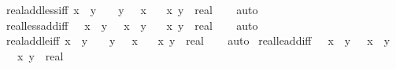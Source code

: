 \begin{isabellebody}
\ real{\isacharunderscore}{\kern0pt}add{\isacharunderscore}{\kern0pt}less{\isacharunderscore}{\kern0pt}{}{\isacharunderscore}{\kern0pt}iff{\isacharcolon}{\kern0pt}\ {\isachardoublequoteopen}x\ {\isacharplus}{\kern0pt}\ y\ {\isacharless}{\kern0pt}\ {}\ {\isasymlongleftrightarrow}\ y\ {\isacharless}{\kern0pt}\ {\isacharminus}{\kern0pt}\ x{\isachardoublequoteclose}\isanewline
\ \ \ x\ y\ {\isacharcolon}{\kern0pt}{\isacharcolon}{\kern0pt}\ real\isanewline
%
\isadelimproof
\ \ %
\endisadelimproof
%
\isatagproof
{}\isamarkupfalse%
\ auto%
\endisatagproof
{\isafoldproof}%
%
\isadelimproof
\isanewline
%
\endisadelimproof
\isanewline
{}\isamarkupfalse%
\ real{\isacharunderscore}{\kern0pt}{}{\isacharunderscore}{\kern0pt}less{\isacharunderscore}{\kern0pt}add{\isacharunderscore}{\kern0pt}iff{\isacharcolon}{\kern0pt}\ {\isachardoublequoteopen}{}\ {\isacharless}{\kern0pt}\ x\ {\isacharplus}{\kern0pt}\ y\ {\isasymlongleftrightarrow}\ {\isacharminus}{\kern0pt}\ x\ {\isacharless}{\kern0pt}\ y{\isachardoublequoteclose}\isanewline
\ \ \ x\ y\ {\isacharcolon}{\kern0pt}{\isacharcolon}{\kern0pt}\ real\isanewline
%
\isadelimproof
\ \ %
\endisadelimproof
%
\isatagproof
{}\isamarkupfalse%
\ auto%
\endisatagproof
{\isafoldproof}%
%
\isadelimproof
\isanewline
%
\endisadelimproof
\isanewline
{}\isamarkupfalse%
\ real{\isacharunderscore}{\kern0pt}add{\isacharunderscore}{\kern0pt}le{\isacharunderscore}{\kern0pt}{}{\isacharunderscore}{\kern0pt}iff{\isacharcolon}{\kern0pt}\ {\isachardoublequoteopen}x\ {\isacharplus}{\kern0pt}\ y\ {\isasymle}\ {}\ {\isasymlongleftrightarrow}\ y\ {\isasymle}\ {\isacharminus}{\kern0pt}\ x{\isachardoublequoteclose}\isanewline
\ \ \ x\ y\ {\isacharcolon}{\kern0pt}{\isacharcolon}{\kern0pt}\ real\isanewline
%
\isadelimproof
\ \ %
\endisadelimproof
%
\isatagproof
{}\isamarkupfalse%
\ auto%
\endisatagproof
{\isafoldproof}%
%
\isadelimproof
\isanewline
%
\endisadelimproof
\isanewline
{}\isamarkupfalse%
\ real{\isacharunderscore}{\kern0pt}{}{\isacharunderscore}{\kern0pt}le{\isacharunderscore}{\kern0pt}add{\isacharunderscore}{\kern0pt}iff{\isacharcolon}{\kern0pt}\ {\isachardoublequoteopen}{}\ {\isasymle}\ x\ {\isacharplus}{\kern0pt}\ y\ {\isasymlongleftrightarrow}\ {\isacharminus}{\kern0pt}\ x\ {\isasymle}\ y{\isachardoublequoteclose}\isanewline
\ \ \ x\ y\ {\isacharcolon}{\kern0pt}{\isacharcolon}{\kern0pt}\ real\isanewline

\end{isabellebody}
